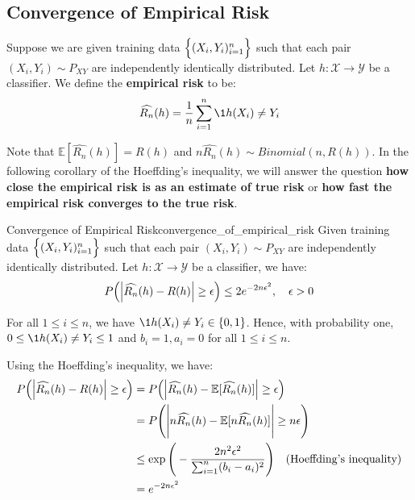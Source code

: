 \subsection{Convergence of Empirical Risk}
\begin{definition}
    Suppose we are given training data $\Big\{ (X_i, Y_i)_{i=1}^n \Big\}$ such that each pair $(X_i, Y_i)\sim P_{XY}$ are independently identically distributed. Let $h:\mathcal{X}\to\mathcal{Y}$ be a classifier. We define the \textbf{empirical risk} to be:
    \begin{align*}
        \widehat{R_n}(h) = \frac{1}{n}\sum_{i=1}^n \1{h(X_i) \ne Y_i}
    \end{align*}

    \noindent Note that $\mathbb{E}[\widehat{R_n}(h)] = R(h)$ and $n\widehat{R_n}(h) \sim Binomial(n, R(h))$. In the following corollary of the Hoeffding's inequality, we will answer the question \textbf{how close the empirical risk is as an estimate of true risk} or \textbf{how fast the empirical risk converges to the true risk}.
\end{definition}

\begin{corollary}{Convergence of Empirical Risk}{convergence_of_empirical_risk}
    Given training data $\Big\{ (X_i, Y_i)_{i=1}^n \Big\}$ such that each pair $(X_i, Y_i)\sim P_{XY}$ are independently identically distributed. Let $h:\mathcal{X}\to\mathcal{Y}$ be a classifier, we have:
    \begin{align*}
        P\Big( 
            \Big| \widehat{R_n}(h) - R(h) \Big| \ge \epsilon
         \Big) \le 2e^{-2n\epsilon^2}, \ \ \ \epsilon > 0
    \end{align*}
\end{corollary}

\begin{proof*}
    For all $1 \le i \le n$, we have $\1{h(X_i) \ne Y_i} \in \{0,1\}$. Hence, with probability one, $0 \le \1{h(X_i)\ne Y_i} \le 1$ and $b_i=1, a_i=0$ for all $1\le i\le n$.

    \noindent \newline Using the Hoeffding's inequality, we have:
    \begin{align*}
        P\Big( 
            \Big| \widehat{R_n}(h) - R(h) \Big| \ge \epsilon
         \Big) 
        &= P\Big( 
            \Big| \widehat{R_n}(h) - \mathbb{E}[\widehat{R_n}(h)] \Big| \ge \epsilon
         \Big) \\
        &= P\Bigg( 
            \Bigg| n\widehat{R_n}(h) - \mathbb{E}[n\widehat{R_n}(h)] \Bigg| \ge n\epsilon
         \Bigg) \\
        &\le \exp\Bigg( 
            - \frac{2n^2\epsilon^2}{\sum_{i=1}^n (b_i - a_i)^2}
         \Bigg) \ \ \ \text{(Hoeffding's inequality)} \\
        &= e^{-2n\epsilon^2}
    \end{align*}
\end{proof*}



